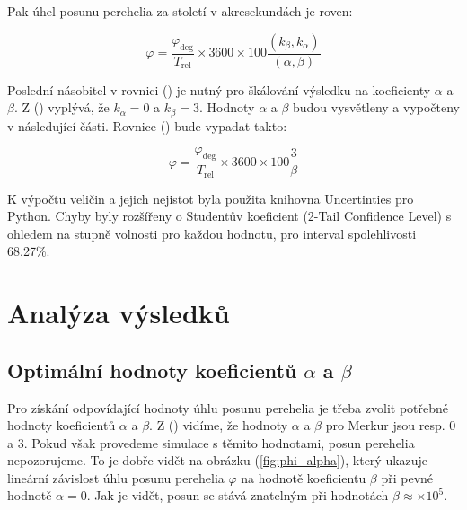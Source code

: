 \documentclass[a4paper,11pt,twocolumn]{article}
\begin{document}
            Pak úhel posunu perehelia za století v akresekundách je roven:

            \begin{equation}
                \varphi = \frac{\varphi_{\text{deg}}}{T_{\text{rel}}} \times 3600 \times 100 \frac{(k_{\beta}, k_{\alpha})}{(\alpha, \beta)}
                \label{eq:phi}
            \end{equation}

            Poslední násobitel v rovnici () je nutný pro škálování výsledku na koeficienty $\alpha$ a $\beta$. Z () vyplývá, že $k_{\alpha} = 0$ a $k_{\beta} = 3$. Hodnoty $\alpha$ a $\beta$ budou vysvětleny a vypočteny v následující části. Rovnice () bude vypadat takto:

            \begin{equation}
                \varphi = \frac{\varphi_{\text{deg}}}{T_{\text{rel}}} \times 3600 \times 100 \frac{3}{\beta}
                \label{eq:phi_final}
            \end{equation}

        K výpočtu veličin a jejich nejistot byla použita knihovna Uncertinties pro Python. Chyby byly rozšířeny o Studentův koeficient (2-Tail Confidence Level) s ohledem na stupně volnosti pro každou hodnotu, pro interval spolehlivosti 68.27\%.

    \section{Analýza výsledků}
        \subsection{Optimální hodnoty koeficientů $\alpha$ a $\beta$}

            Pro získání odpovídající hodnoty úhlu posunu perehelia je třeba zvolit potřebné hodnoty koeficientů $\alpha$ a $\beta$. Z () vidíme, že hodnoty $\alpha$ a $\beta$ pro Merkur jsou resp. 0 a 3. Pokud však provedeme simulace s těmito hodnotami, posun perehelia nepozorujeme. To je dobře vidět na obrázku (\ref{fig:phi_alpha}), který ukazuje lineární závislost úhlu posunu perehelia $\varphi$ na hodnotě koeficientu $\beta$ při pevné hodnotě $\alpha = 0$. Jak je vidět, posun se stává znatelným při hodnotách $\beta \approx \times 10^5$.
            
\end{document}
